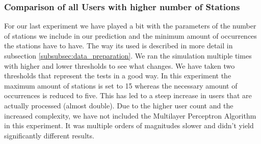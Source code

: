 \newpage
\subsubsection{Comparison of all Users with higher number of Stations}
For our last experiment we have played a bit with the parameters of the number of stations we include in our prediction and the minimum amount of occurrences the stations have to have. The way its used is described in more detail in subsection \ref{subsubsec:data_preparation}. We ran the simulation multiple times with higher and lower thresholds to see what changes. We have taken two thresholds that represent the tests in a good way. In this experiment the maximum amount of stations is set to 15 whereas the necessary amount of occurrences is reduced to five. This has led to a steep increase in users that are actually processed (almost double). Due to the higher user count and the increased complexity, we have not included the Multilayer Perceptron Algorithm in this experiment. It was multiple orders of magnitudes slower and didn't yield significantly different results. 

